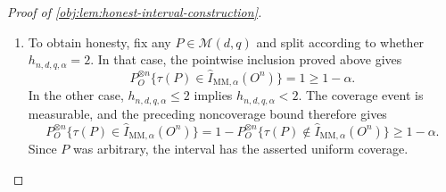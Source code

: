 \begin{proof}[Proof of \cref{obj:lem:honest-interval-construction}]
\begin{enumerate}
Define the noncoverage and squared-error tail events by
\[
\mathcal B_P=\{o\in O^n:\tau(P)\notin[L(o),U(o)]\},
\qquad
\mathcal T_P=\{o\in O^n:h_{n,d,q,\alpha}^2\le\mathcal E_P(o)\}.
\]
We claim that
\[
\mathcal B_P\subseteq\mathcal T_P.
\]
Indeed, noncoverage gives either \(\tau(P)<L(o)\) or \(U(o)<\tau(P)\). In the first case, if
\(-1\le\widehat\tau_{\mathrm{MM}}(o)-h_{n,d,q,\alpha}\), then
\[
L(o)=\widehat\tau_{\mathrm{MM}}(o)-h_{n,d,q,\alpha},
\qquad
h_{n,d,q,\alpha}
<\widehat\tau_{\mathrm{MM}}(o)-\tau(P).
\]
Otherwise \(L(o)=-1\), contradicting \(\tau(P)\ge-1\). In the second case, if
\(\widehat\tau_{\mathrm{MM}}(o)+h_{n,d,q,\alpha}\le1\), then
\[
U(o)=\widehat\tau_{\mathrm{MM}}(o)+h_{n,d,q,\alpha},
\qquad
h_{n,d,q,\alpha}
<\tau(P)-\widehat\tau_{\mathrm{MM}}(o).
\]
Otherwise \(U(o)=1\), contradicting \(\tau(P)\le1\). Squaring the positive inequalities in the two possible cases gives
\[
h_{n,d,q,\alpha}^2
\le\bigl(\widehat\tau_{\mathrm{MM}}(o)-\tau(P)\bigr)^2,
\]
as claimed.

The sample space is finite, so the squared-error function is integrable. Its nonnegativity and Markov's inequality give
\[
h_{n,d,q,\alpha}^2\,\mu_{\mathrm{obs}}(\mathcal T_P)
\le
\int\mathcal E_P(o)\,d\mu_{\mathrm{obs}}(o).
\]
Applying the assumed uniform risk certificate to this iid sample law, and using event inclusion, yields
\[
h_{n,d,q,\alpha}^2\,\mu_{\mathrm{obs}}(\mathcal B_P)
\le
h_{n,d,q,\alpha}^2\,\mu_{\mathrm{obs}}(\mathcal T_P)
\le
\int\mathcal E_P(o)\,d\mu_{\mathrm{obs}}(o)
\le
C_Ur_{n,d,q}
=\alpha h_{n,d,q,\alpha}^2.
\]
Dividing by the strictly positive squared radius proves
\[
P_O^{\otimes n}\{\tau(P)\notin\widehat I_{\mathrm{MM},\alpha}(O^n)\}
\le\alpha.
\]

\item To obtain honesty, fix any \(P\in\mathcal M(d,q)\) and split according to whether \(h_{n,d,q,\alpha}=2\). In that case, the pointwise inclusion proved above gives
\[
P_O^{\otimes n}\{\tau(P)\in\widehat I_{\mathrm{MM},\alpha}(O^n)\}
=1\ge1-\alpha.
\]
In the other case, \(h_{n,d,q,\alpha}\le2\) implies \(h_{n,d,q,\alpha}<2\). The coverage event is measurable, and the preceding noncoverage bound therefore gives
\[
P_O^{\otimes n}\{\tau(P)\in\widehat I_{\mathrm{MM},\alpha}(O^n)\}
=
1-P_O^{\otimes n}\{\tau(P)\notin\widehat I_{\mathrm{MM},\alpha}(O^n)\}
\ge1-\alpha.
\]
Since \(P\) was arbitrary, the interval has the asserted uniform coverage.


\end{enumerate}
\end{proof}
